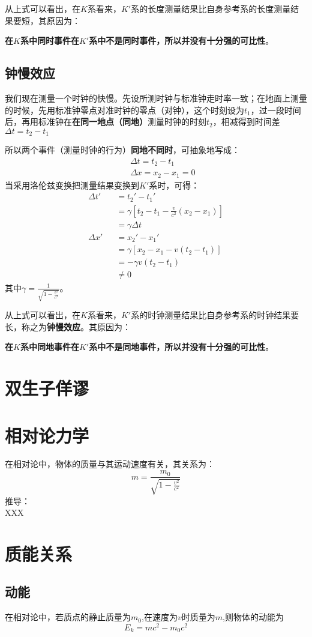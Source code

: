 \documentclass[11pt]{article}
\newcommand{\be}{\begin{equation}}
\newcommand{\ee}{\end{equation}}
\newcommand{\bea}{\setlength\arraycolsep{2pt} \begin{eqnarray}}
\newcommand{\eea}{\end{eqnarray}}
\numberwithin{equation}{section}
\begin{document}
\begin{CJK}{GBK}{song}
从上式可以看出，在$K$系看来，$K'$系的长度测量结果比自身参考系的长度测量结果要短，其原因为：

\textbf{在$K$系中同时事件在$K'$系中不是同时事件，所以并没有十分强的可比性}。
\subsection{钟慢效应}
我们现在测量一个时钟的快慢。先设所测时钟与标准钟走时率一致；在地面上测量的时候，先用标准钟零点对准时钟的零点（对钟），这个时刻设为$t_1$，过一段时间后，再用标准钟在\textbf{在同一地点（同地）}测量时钟的时刻$t_2$，相减得到时间差$\Delta t=t_2-t_1$

所以两个事件（测量时钟的行为）\textbf{同地不同时}，可抽象地写成：
\bea
&&\Delta t=t_2-t_1 \\
&&\Delta x =x_2-x_1=0
\eea
当采用洛伦兹变换把测量结果变换到$K'$系时，可得：
\bea
\Delta t'&&=t_2'-t_1' \\
&&=\gamma[t_2-t_1-\frac{v}{c^2}(x_2-x_1)]\\
&&=\gamma \Delta t \\
\Delta x'&&=x_2'-x_1' \\
&&=\gamma[x_2-x_1-v(t_2-t_1)]\\
&&=-\gamma v(t_2-t_1) \\
&&\not =0
\eea
其中$\gamma=\frac{1}{\sqrt{1-\frac{v^2}{c^2}}}$。

从上式可以看出，在$K$系看来，$K'$系的时钟测量结果比自身参考系的时钟结果要长，称之为\textbf{钟慢效应}。其原因为：

\textbf{在$K$系中同地事件在$K'$系中不是同地事件，所以并没有十分强的可比性}。

\section{双生子佯谬}
\section{相对论力学}
在相对论中，物体的质量与其运动速度有关，其关系为：
\be
m=\frac{m_0}{\sqrt{1-\frac{v^2}{c^2}}}
\ee
推导：\\
XXX

\section{质能关系}
\subsection{动能}
在相对论中，若质点的静止质量为$m_0$,在速度为$v$时质量为$m$,则物体的动能为
\be
E_k=mc^2-m_0c^2
\ee


\end{CJK}
\end{document}
